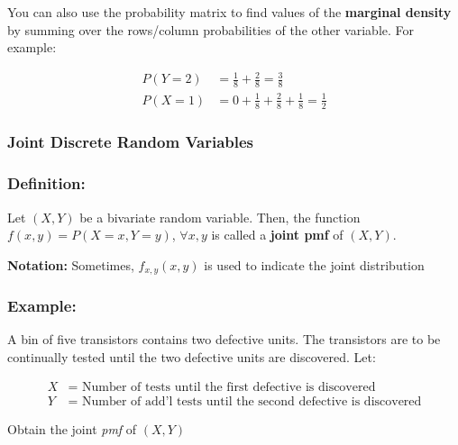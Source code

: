 \documentclass{article}
\begin{document}
You can also use the probability matrix to find values of the \textbf{marginal density} by summing over the rows/column probabilities of the other variable. For example:

\begin{equation*}
\begin{split}
    P(Y=2) &= \frac{1}{8} + \frac{2}{8} = \frac{3}{8}\\
    P(X=1) &= 0 + \frac{1}{8} + \frac{2}{8} + \frac{1}{8} = \frac{1}{2}
\end{split}
\end{equation*}

\subsubsection{Joint Discrete Random Variables}

\subsubsection*{Definition:}

Let $(X,Y)$ be a bivariate random variable. Then, the function $f(x,y) = P(X=x,Y=y)$, $\forall x,y$ is called a \textbf{joint pmf} of $(X,Y)$.

\noindent\textbf{Notation:} Sometimes, $f_{x,y}(x,y)$ is used to indicate the joint distribution

\subsubsection*{Example:}

A bin of five transistors contains two defective units. The transistors are to be continually tested until the two defective units are discovered. Let:

\begin{equation*}
    \begin{split}
        X &= \text{ Number of tests until the first defective is discovered}\\
        Y &= \text{ Number of add'l tests until the second defective is discovered}
    \end{split}
\end{equation*}

Obtain the joint \textit{pmf} of $(X,Y)$
\end{document}
